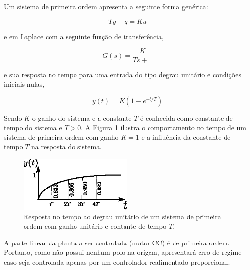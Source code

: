 Um sistema de primeira ordem apresenta a seguinte forma genérica:

\begin{equation}
    T\dot{y} + y = Ku
\end{equation}

e em Laplace com a seguinte função de transferência,

\begin{equation}
    G(s) = \frac{K}{Ts + 1}
\end{equation}

e sua resposta no tempo para uma entrada do tipo degrau unitário e condições iniciais nulas,

\begin{equation}
    y(t) = K \left(1 - e^{-t/T} \right)
\end{equation}

Sendo $K$ o ganho do sistema e a constante $T$ é conhecida como constante de tempo do sistema e $T > 0$. A Figura \ref{fig:saida_sistema_primeira_ordem_no_tempo} ilustra o comportamento no tempo de um sistema de primeira ordem com ganho $K = 1$ e a influência da constante de tempo $T$ na resposta do sistema.

\begin{figure}[H]
    \centering
    \includegraphics[width=0.5\textwidth]{figuras/ilustracoes/resposta_no_tempo_sistema_primeira_ordem.eps}
    \caption{Resposta no tempo ao degrau unitário de um sistema de primeira ordem com ganho unitário e contante de tempo $T$.}
    \label{fig:saida_sistema_primeira_ordem_no_tempo}
\end{figure}

A parte linear da planta a ser controlada (motor CC) é de primeira ordem. Portanto, como não possui nenhum polo na origem, apresentará erro de regime caso seja controlada apenas por um controlador realimentado proporcional.

